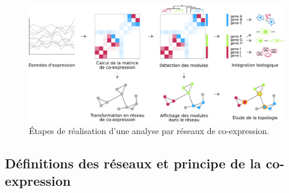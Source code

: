 \begin{figure}[h!]
    \centering
    \includegraphics[width=\textwidth]{img/intro/3_coexpr/intro_3_coexpr_principle.pdf}
    \caption[Étapes de réalisation d'une analyse par réseaux de co-expression.]{Étapes de réalisation d'une analyse par réseaux de co-expression.}
    \label{fig:coexpr_pipeline}
\end{figure}



\subsection{Définitions des réseaux et principe de la co-expression}

